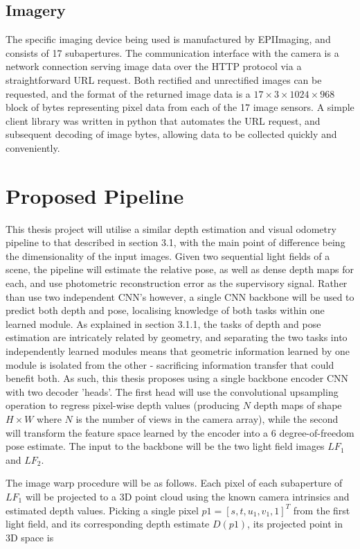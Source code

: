 \documentclass[openany]{book}
\begin{document}
\subsection{Imagery}

The specific imaging device being used is manufactured by EPIImaging, and consists of 17 subapertures. The communication interface with the camera is a network connection serving image data over the HTTP protocol via a straightforward URL request. Both rectified and unrectified images can be requested, and the format of the returned image data is a $17\times 3 \times 1024 \times 968$ block of bytes representing pixel data from each of the 17 image sensors. A simple client library was written in python that automates the URL request, and subsequent decoding of image bytes, allowing data to be collected quickly and conveniently.

\section{Proposed Pipeline}

This thesis project will utilise a similar depth estimation and visual odometry pipeline to that described in section 3.1, with the main point of difference being the dimensionality of the input images. Given two sequential light fields of a scene, the pipeline will estimate the relative pose, as well as dense depth maps for each, and use photometric reconstruction error as the supervisory signal. Rather than use two independent CNN's however, a single CNN backbone will be used to predict both depth and pose, localising knowledge of both tasks within one learned module. As explained in section 3.1.1, the tasks of depth and pose estimation are intricately related by geometry, and separating the two tasks into independently learned modules means that geometric information learned by one module is isolated from the other - sacrificing information transfer that could benefit both. As such, this thesis proposes using a single backbone encoder CNN with two decoder 'heads'. The first head will use the convolutional upsampling operation to regress pixel-wise depth values (producing $N$ depth maps of shape $H\times W$ where $N$ is the number of views in the camera array), while the second will transform the feature space learned by the encoder into a 6 degree-of-freedom pose estimate. The input to the backbone will be the two light field images $LF_1$ and $LF_2$. 


The image warp procedure will be as follows. Each pixel of each subaperture of $LF_1$ will be projected to a 3D point cloud using the known camera intrinsics and estimated depth values. Picking a single pixel $p1 = [s,t,u_1,v_1,1]^T$ from the first light field, and its corresponding depth estimate $D(p1)$, its projected point in 3D space is
\end{document}
